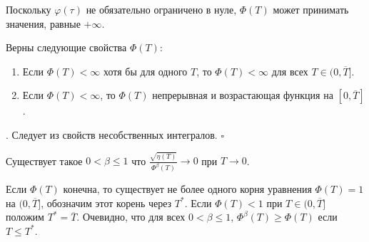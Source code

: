 \documentclass[../main.tex]{subfiles}
\begin{document}
Поскольку $\varphi(\tau)$ не обязательно ограничено в нуле, $\Phi(T)$ может принимать значения, равные $+\infty$.
\begin{lemma}%
Верны следующие свойства $\Phi(T)$:
\begin{enumerate}
 \item Если $\Phi(T) < \infty $ хотя бы для одного $T$, то $\Phi(T) < \infty $ для всех $T \in (0, \overline{T}]$.
\item Если $\Phi(T) < \infty $, то $\Phi(T)$ непрерывная и возрастающая функция на $ [0,\overline{T}]$.
 \end{enumerate}
\end{lemma}
\doc. Следует из свойств несобственных интегралов. \hfill $ \square $
\begin{assumption}\label{asm2}
Существует такое $ 0 < \beta \leqslant 1$ что $\frac{\sqrt{\eta(T)}}{\Phi^\beta(T)} \to 0$ при $T \to 0$.
\end{assumption}
Если $\Phi(T)$ конечна, то существует не более одного корня уравнения $\Phi(T)=1$ на $(0,\overline{T}]$, обозначим этот корень через $T^*$.   
Если $\Phi(T)<1$ при $T\in (0,\overline{T}]$ положим $T^*=\overline{T}$. 
Очевидно, что для всех  $ 0 < \beta \leqslant 1$,   $\Phi^\beta(T)\geqslant \Phi(T)$ если $T \leqslant T^*$.
\end{document}
